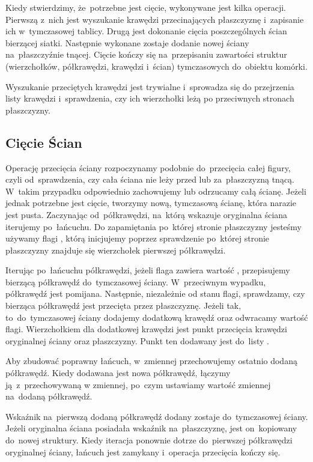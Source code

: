 \documentclass[skorowidz,autorrok,backref,xodstep,oswiadczenie]{wmimgr}
\begin{document}
Kiedy stwierdzimy, że~potrzebne jest cięcie, wykonywane jest kilka operacji. Pierwszą z~nich jest wyszukanie krawędzi przecinających płaszczyznę i~zapisanie ich w~tymczasowej tablicy. Drugą jest dokonanie cięcia poszczególnych ścian bierzącej siatki. Następnie wykonane zostaje dodanie nowej ściany na~płaszczyźnie tnącej. Cięcie kończy się na~przepisaniu zawartości struktur (wierzchołków, półkrawędzi, krawędzi i~ścian) tymczasowych do~obiektu komórki.

Wyszukanie przeciętych krawędzi jest trywialne i~sprowadza się do przejrzenia listy krawędzi i~sprawdzenia, czy ich wierzchołki leżą po przeciwnych stronach płaszczyzny.

\subsection{Cięcie Ścian}

Operację przecięcia ściany rozpoczynamy podobnie do~przecięcia całej figury, czyli od~sprawdzenia, czy cała ściana nie leży przed lub za~płaszczyzną tnącą. W~takim przypadku odpowiednio zachowujemy lub odrzucamy całą ścianę. Jeżeli jednak potrzebne jest cięcie, tworzymy nową, tymczasową ścianę, która narazie jest pusta. Zaczynając od~półkrawędzi, na~którą wskazuje oryginalna ściana iterujemy po~łańcuchu. Do zapamiętania po~której stronie płaszczyzny jesteśmy używamy flagi , którą inicjujemy poprzez sprawdzenie po~której stronie płaszczyzny znajduje się wierzchołek pierwszej półkrawędzi.

Iterując po~łańcuchu półkrawędzi, jeżeli flaga  zawiera wartość , przepisujemy bierzącą półkrawędź do~tymczasowej ściany. W~przeciwnym wypadku, półkrawędź jest pomijana. Następnie, niezależnie od stanu flagi, sprawdzamy, czy bierząca półkrawędź jest przecięta przez płaszczyznę. Jeżeli tak, to~do~tymczasowej ściany dodajemy dodatkową krawędź oraz odwracamy wartość flagi. Wierzchołkiem dla dodatkowej krawędzi jest punkt przecięcia krawędzi oryginalnej ściany oraz płaszczyzny. Punkt ten dodawany jest do~listy .

Aby zbudować poprawny łańcuch, w~zmiennej  przechowujemy ostatnio dodaną półkrawędź. Kiedy dodawana jest nowa półkrawędź, łączymy ją~z~przechowywaną w zmiennej, po~czym ustawiamy wartość zmiennej na~dodaną półkrawędź.

Wskaźnik na~pierwszą dodaną półkrawędź dodany zostaje do~tymczasowej ściany. Jeżeli oryginalna ściana posiadała wskaźnik na~płaszczyznę, jest on~kopiowany do~nowej struktury. Kiedy iteracja ponownie dotrze do~pierwszej półkrawędzi oryginalnej ściany, łańcuch jest zamykany i~operacja przecięcia kończy się.
\end{document}
